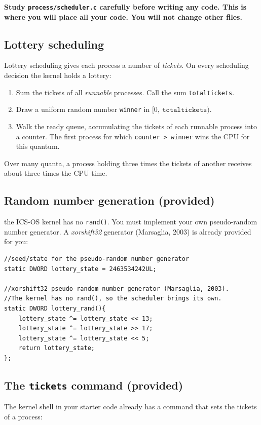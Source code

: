 \documentclass[a4paper, 11pt,oneside]{article}
\begin{document}
\textbf{Study \texttt{process/scheduler.c} carefully before writing any code. This is where you will place all your code. You will not change other files.}

\subsection*{Lottery scheduling}
Lottery scheduling gives each process a number of \textit{tickets}. On every scheduling decision the kernel holds a lottery:

\begin{enumerate}[itemsep=0pt,parsep=0pt]
  \item Sum the tickets of all \textit{runnable} processes. Call the sum \texttt{totaltickets}.
  \item Draw a uniform random number \texttt{winner} in $[0,\ \texttt{totaltickets})$.
  \item Walk the ready queue, accumulating the tickets of each runnable process into a counter. The first process for which \texttt{counter > winner} wins the CPU for this quantum.
\end{enumerate}

Over many quanta, a process holding three times the tickets of another receives about three times the CPU time.


\subsection*{Random number generation (provided)}
the ICS-OS kernel has no \texttt{rand()}. You must implement your own pseudo-random number generator. A \textit{xorshift32} generator (Marsaglia, 2003) is already provided for you:

\begin{verbatim}
//seed/state for the pseudo-random number generator
static DWORD lottery_state = 2463534242UL;

//xorshift32 pseudo-random number generator (Marsaglia, 2003).
//The kernel has no rand(), so the scheduler brings its own.
static DWORD lottery_rand(){
	lottery_state ^= lottery_state << 13;
	lottery_state ^= lottery_state >> 17;
	lottery_state ^= lottery_state << 5;
	return lottery_state;
};
\end{verbatim}

\subsection*{The \texttt{tickets} command (provided)}
The kernel shell in your starter code already has a command that sets the tickets of a process:
\end{document}
